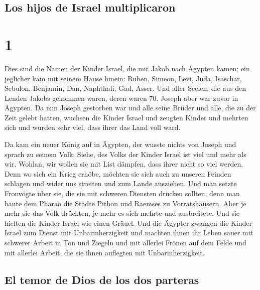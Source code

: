 \hypertarget{los-hijos-de-israel-multiplicaron}{%
\subsection{Los hijos de Israel
multiplicaron}\label{los-hijos-de-israel-multiplicaron}}

\hypertarget{section}{%
\section{1}\label{section}}

 Dies sind die Namen der Kinder Israel, die mit Jakob nach
Ägypten kamen; ein jeglicher kam mit seinem Hause hinein: 
Ruben, Simeon, Levi, Juda,  Isaschar, Sebulon, Benjamin,
 Dan, Naphthali, Gad, Asser.  Und aller
Seelen, die aus den Lenden Jakobs gekommen waren, deren waren 70. Joseph
aber war zuvor in Ägypten.  Da nun Joseph gestorben war
und alle seine Brüder und alle, die zu der Zeit gelebt hatten,
 wuchsen die Kinder Israel und zeugten Kinder und mehrten
sich und wurden sehr viel, dass ihrer das Land voll ward.

 Da kam ein neuer König auf in Ägypten, der wusste nichts
von Joseph  und sprach zu seinem Volk: Siehe, des Volks
der Kinder Israel ist viel und mehr als wir.  Wohlan, wir
wollen sie mit List dämpfen, dass ihrer nicht so viel werden. Denn wo
sich ein Krieg erhöbe, möchten sie sich auch zu unseren Feinden schlagen
und wider uns streiten und zum Lande ausziehen.  Und man
setzte Fronvögte über sie, die sie mit schweren Diensten drücken
sollten; denn man baute dem Pharao die Städte Pithon und Raemses zu
Vorratshäusern.  Aber je mehr sie das Volk drückten, je
mehr es sich mehrte und ausbreitete. Und sie hielten die Kinder Israel
wie einen Gräuel.  Und die Ägypter zwangen die Kinder
Israel zum Dienst mit Unbarmherzigkeit  und machten ihnen
ihr Leben sauer mit schwerer Arbeit in Ton und Ziegeln und mit allerlei
Frönen auf dem Felde und mit allerlei Arbeit, die sie ihnen auflegten
mit Unbarmherzigkeit.

\hypertarget{el-temor-de-dios-de-los-dos-parteras}{%
\subsection{El temor de Dios de los dos
parteras}\label{el-temor-de-dios-de-los-dos-parteras}}

